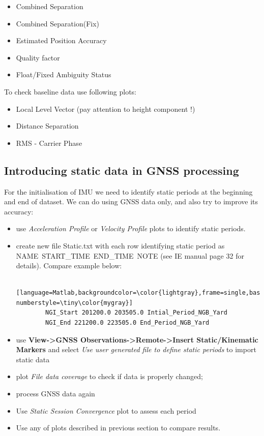 \documentclass[british,DIV=calc, paper=a4, fontsize=12pt, onecolumn]{scrartcl}
\begin{document}
\begin{itemize}
	\item Combined Separation
	\item Combined Separation(Fix)
	\item Estimated Position Accuracy
	\item Quality factor
	\item Float/Fixed Ambiguity Status
\end{itemize}

To check baseline data use following plots:

\begin{itemize}
	\item Local Level Vector (pay attention to height component !)
	\item Distance Separation
	\item RMS - Carrier Phase
\end{itemize}

\subsection{Introducing static data in GNSS processing}

For the initialisation of IMU we need to identify static periods at the beginning and end of dataset. We can do using GNSS data only, and also try to improve its accuracy:

\begin{itemize}
\item use \emph{Acceleration Profile} or \emph{Velocity Profile} plots to
identify static periods.
\item create new file Static.txt with each row identifying static period as NAME~START\_TIME~END\_TIME~NOTE (see IE manual page 32 for details). Compare example below: 
	\begin{lstlisting} [language=Matlab,backgroundcolor=\color{lightgray},frame=single,basicstyle=\footnotesize,numbers=left,numbersep=5pt, numberstyle=\tiny\color{mygray}]
		NGI_Start 201200.0 203505.0 Intial_Period_NGB_Yard
		NGI_End 221200.0 223505.0 End_Period_NGB_Yard
	\end{lstlisting}
\item use \textbf{View->GNSS Observations->Remote->Insert Static/Kinematic Markers} and select \textit{Use user generated file to define static periods} to import static data
\item plot \textit{File data coverage} to check if data is properly changed;
\item process GNSS data again
\item Use \emph{Static Session Convergence} plot to assess each period
\item Use any of plots described in previous section to compare results.
\end{itemize}
\end{document}
